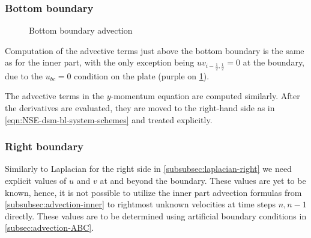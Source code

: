 \documentclass{article}
\numberwithin{equation}{section}
\begin{document}
\subsubsection{Bottom boundary}\label{subsubsec:advection-bottom}
\begin{figure}[H] %
  \caption{Bottom boundary advection}\label{fig:ADV-bottom}
\end{figure}
Computation of the advective terms just above the bottom boundary is the same as for the inner part, with the only exception being $uv_{i-\frac{1}{2},\frac{1}{2}}=0$ at the boundary, due to the $u_{bc}=0$ condition on the plate (purple on \cref{fig:ADV-bottom}).

The advective terms in the $y$-momentum equation are computed similarly. After the derivatives are evaluated, they are moved to the right-hand side as in \cref{eqn:NSE-dsm-bl-system-schemes} and treated explicitly. 

\subsubsection{Right boundary}\label{subsubsec:advection-right}

Similarly to Laplacian for the right side in \cref{subsubsec:laplacian-right} we need explicit values of $u$ and  $v$ at and beyond the boundary. These values are yet to be known, hence, it is not possible to utilize the inner part advection formulas from \cref{subsubsec:advection-inner} to rightmost unknown velocities at time steps $n,n-1$ directly. These values are to be determined using artificial boundary conditions in \cref{subsec:advection-ABC}. 
\end{document}
